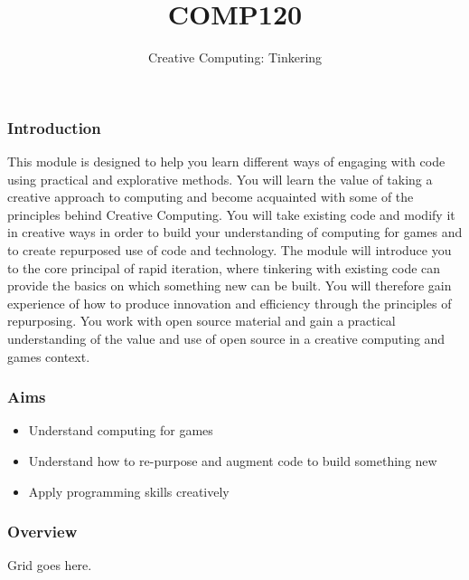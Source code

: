 \documentclass[handout, xcolor={dvipsnames}]{beamer}\usepackage{etoolbox}\newtoggle{printable}\toggletrue{printable}
\begin{document}
\title{COMP120}
\subtitle{Creative Computing: Tinkering }

\frame{\titlepage} 

\begin{frame}
	\frametitle{Introduction}
This module is designed to help you learn different ways of engaging with code using practical and explorative methods. You will learn the value of taking a creative approach to computing and become acquainted with some of the principles behind Creative Computing. You will take existing code and modify it in creative ways in order to build your understanding of computing for games and to create repurposed use of code and technology. The module will introduce you to the core principal of rapid iteration, where tinkering with existing code can provide the basics on which something new can be built. You will therefore gain experience of how to produce innovation and efficiency through the principles of repurposing. You work with open source material and gain a practical understanding of the value and use of open source in a creative computing and games context. 
	
\end{frame}

\begin{frame}
	\frametitle{Aims}
	\begin{itemize}
		\item Understand computing for games
		\item Understand how to re-purpose and augment code to build something new
		\item Apply programming skills creatively
	\end{itemize}
\end{frame}

\begin{frame}
	\frametitle{Overview}
	
	Grid goes here.
\end{frame}
\end{document}
